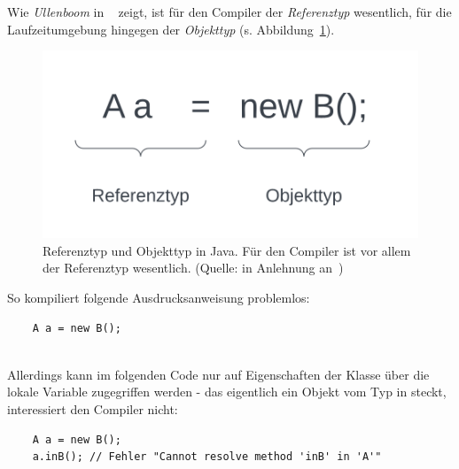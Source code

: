 Wie \textit{Ullenboom} in ~\cite[467 f.]{Ull23} zeigt, ist für den Compiler der \textit{Referenztyp} wesentlich, für die Laufzeitumgebung hingegen der \textit{Objekttyp} (s. Abbildung~\ref{fig:types}).\\

\begin{figure}
    \begin{center}
        \includegraphics[scale=0.5]{chapters/OOP/img/types}
        \caption{Referenztyp und Objekttyp in Java. Für den Compiler ist vor allem der Referenztyp wesentlich. (Quelle: in Anlehnung an~\cite[467 f., ``Begrifflichkeit``]{Ull23})}
        \label{fig:types}
    \end{center}
\end{figure}

\noindent
So kompiliert folgende Ausdrucksanweisung problemlos:

\begin{verbatim}
    A a = new B();
\end{verbatim}\\

\noindent
Allerdings kann im folgenden Code nur auf Eigenschaften der Klasse  über die lokale Variable  zugegriffen werden - das eigentlich ein Objekt vom Typ  in  steckt, interessiert den Compiler nicht:\\

\begin{verbatim}
    A a = new B();
    a.inB(); // Fehler "Cannot resolve method 'inB' in 'A'"
\end{verbatim}\\


